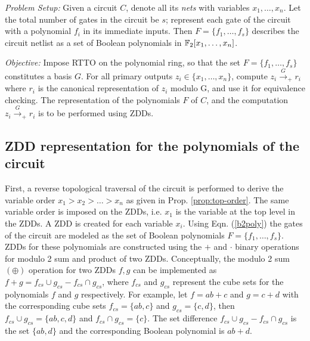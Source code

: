 
{\it Problem Setup:} Given a circuit $C$, denote all its {\it nets}
with variables $x_1,\dots,x_n$. Let the total number of gates in the
circuit be $s$; represent each gate of the circuit with a polynomial
$f_i$ in its immediate inputs. Then $F = \{f_1,\dots,f_s\}$ describes
the circuit netlist as a set of Boolean polynomials in
${\mathbb{F}}_{2}[x_1,\dots,x_n]$.  

{\it Objective:} Impose RTTO on the polynomial ring, so that the set
$F = \{f_1,\dots,f_s\}$ constitutes a \Grobner basis $G$. For all
primary outputs $z_i \in \{x_1,\dots,x_n\}$, compute
$z_i\xrightarrow{G}_+r_i$ where $r_i$ is the canonical representation
of $z_i$ modulo G, and use it for equivalence checking. The
representation of the polynomials $F$ of $C$, and the computation
$z_i\xrightarrow{G}_+r_i$ is to be performed using ZDDs. 

\subsection{ZDD representation for the polynomials of the circuit}


First, a reverse topological traversal of the circuit is performed to
derive the variable order $x_1 > x_2 > \dots > x_n$ as given in
Prop. \ref{prop:top-order}. The same variable order is imposed on the
ZDDs, i.e. $x_1$ is the variable at the top level in the ZDDs. A
ZDD is created for each variable $x_i$. Using Eqn. (\ref{b2poly})
the gates of the circuit are modeled as the set of Boolean polynomials
$F=\{f_1,\dots,f_s\}$. ZDDs for these polynomials 
are constructed using the $+$ and $\cdot$ binary operations for modulo
2 sum and product of two ZDDs.
%
Conceptually, the modulo 2 sum $(\oplus)$ operation for two ZDDs
$f,g$ can be implemented as $f + g = f_{cs}\cup g_{cs}-f_{cs}\cap g_{cs}$, 
where $f_{cs}$ and $g_{cs}$ represent the cube sets for the
polynomials $f$ and $g$ respectively. For example, let $f = ab + c$
and $g = c + d$ with the corresponding cube sets 
$f_{cs} = \{ab,c\}$ and $g_{cs}=\{c,d\}$, then $f_{cs}\cup g_{cs} = \{ab,c,d\}$
and $f_{cs} \cap g_{cs} = \{c\}$. The set difference $f_{cs} \cup g_{cs} - f_{cs}
\cap g_{cs}$ is the set $\{ab,d\}$ and the corresponding Boolean
polynomial is $ab + d$.  


